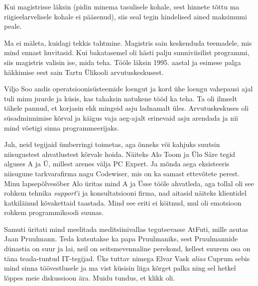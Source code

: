 Kui magistrisse läksin (pidin minema tasulisele kohale, sest 
hinnete tõttu ma riigieelarvelisele kohale ei pääsenud), siis seal tegin
hindelised ained maksimumi peale. 


Ma ei mäleta, kuidagi tekkis tahtmine. Magistris sain keskenduda 
teemadele, mis mind ennast huvitasid. Kui bakatasemel oli hästi palju 
sunniviisilist programmi, siis magistris valisin ise, mida teha. Tööle 
läksin 1995. aastal ja esimese palga häkkimise eest sain Tartu 
Ülikooli arvutuskeskusest. 

Viljo Soo andis operatsioonisüsteemide loengut ja kord 
ühe loengu vahepausi ajal tuli minu juurde ja küsis, kas tahaksin natukene tööd ka teha. Ta oli ilmselt 
tähele pannud, et korjasin ehk
mingeid asju ladnamalt üles. Arvutuskeskuses oli süsadminnimise 
kõrval ja käigus vaja aeg-ajalt erinevaid asju arendada ja nii mind võetigi 
sinna programmeerijaks. 


Jah, neid tegijaid ümberringi toimetas, aga 
õnneks või kahjuks suutsin niisugustest ahvatlustest kõrvale hoida. Näiteks Alo Toom ja Ülo Säre tegid alguses A ja Ü, millest arenes välja PC 
Expert. Ja mõnda aega eksisteeris niisugune tarkvarafirma 
nagu Codewiser, mis on ka samast ettevõtete perest. Minu lapsepõlvesõber Alo üritas mind A ja Üsse tööle ahvatleda, 
aga tollal oli see rohkem tehnika \emph{support}'i ja konsultatsiooni 
firma, nad aitasid näiteks klientidel katkiläinud kõvakettaid taastada. Mind see eriti ei köitnud, mul oli emotsioon rohkem 
programmikoodi suunas. 

Samuti üritati mind meelitada meditsiinivallas tegutsevasse 
AtFuti, mille asutas Jaan 
Pruulmann. Teda kutsutakse ka
papa Pruulmaniks, sest Pruulmannide dünastia on suur ja 
lai, neil on seitsmevennaline perekond, kellest suurem osa on täna 
teada-tuntud IT-tegijad. Üks tuttav nimega Elvar Vask \emph{alias} 
Cuprum sebis mind sinna 
töövestlusele ja ma vist küsisin liiga kõrget 
palka ning sel hetkel lõppes meie diskussioon ära. Muidu tundus, et klikk oli. 

